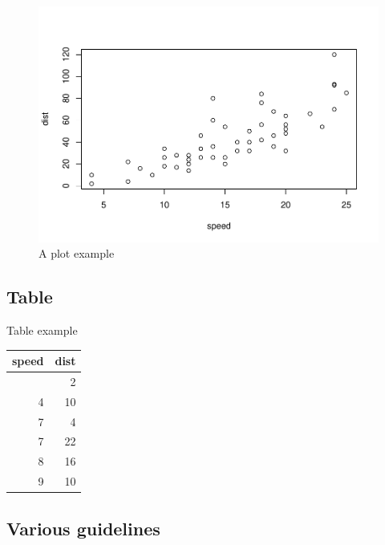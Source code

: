 \documentclass[12pt]{article}
\begin{document}
\begin{figure}
\centering
\includegraphics{Projet_final_files/figure-latex/unnamed-chunk-1-1.pdf}
\caption{A plot example}
\end{figure}

\subsection{Table}\label{table}

Table example

\begin{longtable}[]{@{}rr@{}}
\toprule\noalign{}
speed & dist \\
\midrule\noalign{}
\endhead
\bottomrule\noalign{}
\endlastfoot
4 & 2 \\
4 & 10 \\
7 & 4 \\
7 & 22 \\
8 & 16 \\
9 & 10 \\
\end{longtable}

\subsection{Various guidelines}\label{various-guidelines}
\end{document}
